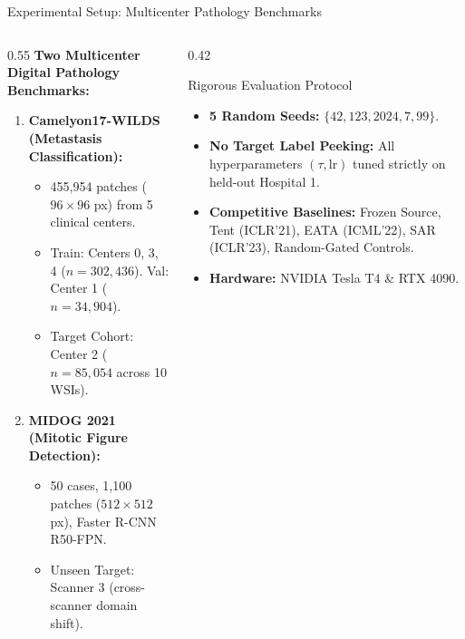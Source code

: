 \documentclass[aspectratio=169,10pt]{beamer}
\begin{document}
\begin{frame}{Experimental Setup: Multicenter Pathology Benchmarks}
    \begin{columns}[T]
        \begin{column}{0.55\textwidth}
            \textbf{Two Multicenter Digital Pathology Benchmarks:}
            \begin{enumerate}
                \item \textbf{Camelyon17-WILDS (Metastasis Classification):}
                \begin{itemize}
                    \item 455,954 patches ($96 \times 96$ px) from 5 clinical centers.
                    \item Train: Centers 0, 3, 4 ($n=302,436$). Val: Center 1 ($n=34,904$).
                    \item Target Cohort: Center 2 ($n=85,054$ across 10 WSIs).
                \end{itemize}
                \item \textbf{MIDOG 2021 (Mitotic Figure Detection):}
                \begin{itemize}
                    \item 50 cases, 1,100 patches ($512 \times 512$ px), Faster R-CNN R50-FPN.
                    \item Unseen Target: Scanner 3 (cross-scanner domain shift).
                \end{itemize}
            \end{enumerate}
        \end{column}
        \begin{column}{0.42\textwidth}
            \begin{block}{Rigorous Evaluation Protocol}
                \small
                \begin{itemize}
                    \item \textbf{5 Random Seeds:} $\{42, 123, 2024, 7, 99\}$.
                    \item \textbf{No Target Label Peeking:} All hyperparameters $(\tau, \text{lr})$ tuned strictly on held-out Hospital 1.
                    \item \textbf{Competitive Baselines:} Frozen Source, Tent (ICLR'21), EATA (ICML'22), SAR (ICLR'23), Random-Gated Controls.
                    \item \textbf{Hardware:} NVIDIA Tesla T4 \& RTX 4090.
                \end{itemize}
            \end{block}
        \end{column}
    \end{columns}
\end{frame}
\end{document}
